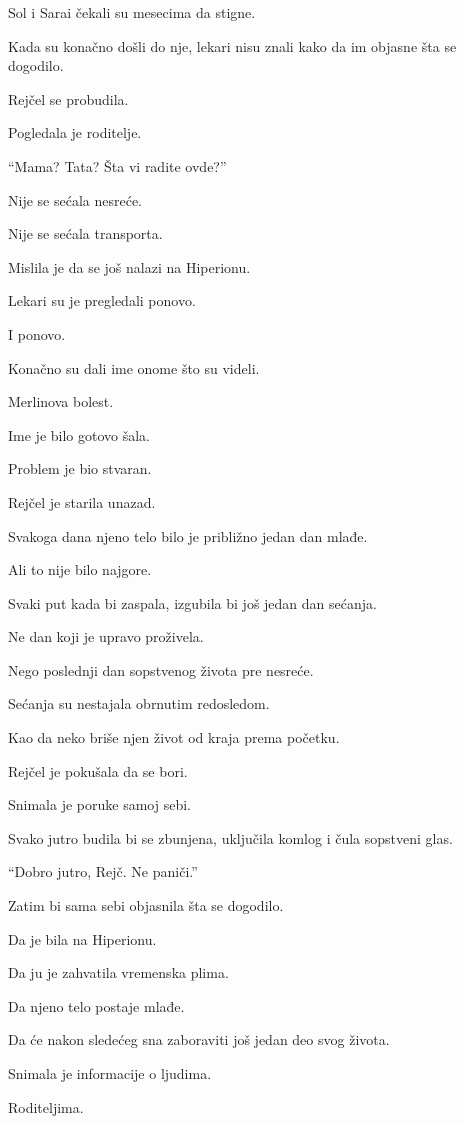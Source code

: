 Sol i Sarai čekali su mesecima da stigne.

Kada su konačno došli do nje, lekari nisu znali kako da im objasne šta se dogodilo.

Rejčel se probudila.

Pogledala je roditelje.

``Mama? Tata? Šta vi radite ovde?''

Nije se sećala nesreće.

Nije se sećala transporta.

Mislila je da se još nalazi na Hiperionu.

Lekari su je pregledali ponovo.

I ponovo.

Konačno su dali ime onome što su videli.

Merlinova bolest.

Ime je bilo gotovo šala.

Problem je bio stvaran.

Rejčel je starila unazad.

Svakoga dana njeno telo bilo je približno jedan dan mlađe.

Ali to nije bilo najgore.

Svaki put kada bi zaspala, izgubila bi još jedan dan sećanja.

Ne dan koji je upravo proživela.

Nego poslednji dan sopstvenog života pre nesreće.

Sećanja su nestajala obrnutim redosledom.

Kao da neko briše njen život od kraja prema početku.

\bigskip

Rejčel je pokušala da se bori.

Snimala je poruke samoj sebi.

Svako jutro budila bi se zbunjena, uključila komlog i čula sopstveni glas.

``Dobro jutro, Rejč. Ne paniči.''

Zatim bi sama sebi objasnila šta se dogodilo.

Da je bila na Hiperionu.

Da ju je zahvatila vremenska plima.

Da njeno telo postaje mlađe.

Da će nakon sledećeg sna zaboraviti još jedan deo svog života.

Snimala je informacije o ljudima.

Roditeljima.

